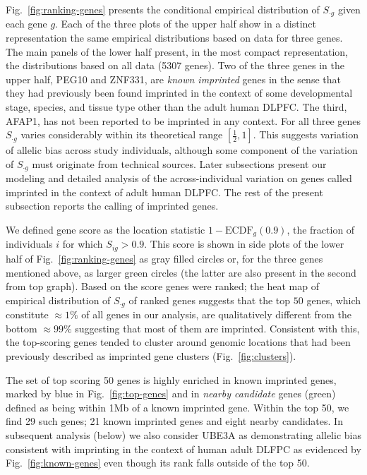 \documentclass[12pt,letterpaper]{article}
\begin{document}
Fig.~\ref{fig:ranking-genes} presents the conditional empirical distribution
of \(S_{\cdot g}\) given each gene \(g\).  Each of the three plots of the
upper half show in a distinct representation the same empirical distributions
based on data for three genes.  The main panels of the lower half present, in
the most compact representation, the distributions based on all data (5307
genes).  Two of the three genes in the upper half, PEG10 and ZNF331, are
\emph{known imprinted} genes in the sense that they had previously been found
imprinted in the context of some developmental stage, species, and tissue type
other than the adult human DLPFC.  The third, AFAP1, has not been reported to be imprinted
in any context.  For all three genes \(S_{\cdot g}\) varies considerably
within its theoretical range \([\frac{1}{2}, 1]\).  This suggests variation of
allelic bias across study individuals, although some component of the
variation of \(S_{\cdot g}\) must originate from technical sources.  Later
subsections present our modeling and detailed analysis of the
across-individual variation on genes called imprinted in the context of adult
human DLPFC.  The rest of the present subsection reports the calling of
imprinted genes.

We defined gene score as
the location statistic \(1 - \mathrm{ECDF}_g(0.9)\), the fraction of
individuals \(i\) for which \(S_{ig}>0.9\).  This score is shown in side plots
of the lower half of Fig.~\ref{fig:ranking-genes} as gray filled circles or,
for the three genes mentioned above, as larger green circles (the latter are
also present in the second from top graph).  Based on the score genes were
ranked; the heat map of empirical distribution of \(S_{\cdot g}\) of ranked
genes suggests that the top \(50\) genes, which constitute \(\approx
1\%\) of all genes in our analysis, are qualitatively different from the
bottom \(\approx 99\%\) suggesting that most of them are imprinted.
Consistent with this, the top-scoring genes tended to cluster around genomic
locations that had been previously described as imprinted gene clusters
(Fig.~\ref{fig:clusters}).

The set of top scoring 50 genes is highly enriched in known imprinted genes,
marked by blue in Fig.~\ref{fig:top-genes} and in \emph{nearby candidate}
genes (green) defined as being within 1Mb of a known imprinted gene. Within
the top 50, we find 29 such genes; 21 known imprinted genes and eight nearby
candidates.  In subsequent analysis (below) we also consider UBE3A as
demonstrating allelic bias consistent with imprinting in the context of human
adult DLFPC as evidenced by Fig.~\ref{fig:known-genes} even though its rank
falls outside of the top 50.
\end{document}

